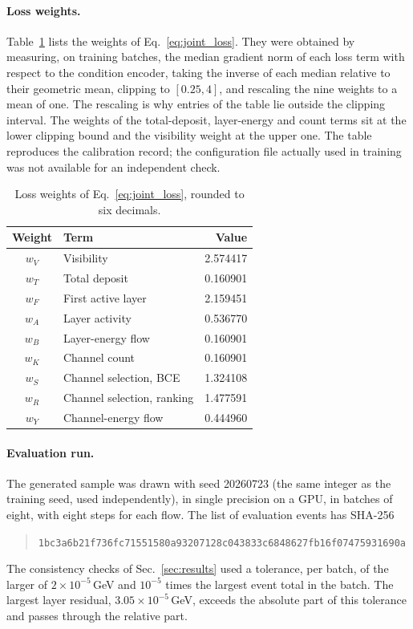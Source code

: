\documentclass[11pt]{article}
\begin{document}
\paragraph{Loss weights.} Table~\ref{tab:weights} lists the weights of Eq.~\eqref{eq:joint_loss}. They were obtained by measuring, on training batches, the median gradient norm of each loss term with respect to the condition encoder, taking the inverse of each median relative to their geometric mean, clipping to $[0.25,4]$, and rescaling the nine weights to a mean of one. The rescaling is why entries of the table lie outside the clipping interval. The weights of the total-deposit, layer-energy and count terms sit at the lower clipping bound and the visibility weight at the upper one. The table reproduces the calibration record; the configuration file actually used in training was not available for an independent check.

\begin{table}[H]
\centering
\caption{Loss weights of Eq.~\eqref{eq:joint_loss}, rounded to six decimals.}
\label{tab:weights}
\small
\begin{tabular}{@{}clr@{}}
\toprule
Weight & Term & Value \\
\midrule
$w_{V}$ & Visibility & 2.574417 \\
$w_{T}$ & Total deposit & 0.160901 \\
$w_{F}$ & First active layer & 2.159451 \\
$w_{A}$ & Layer activity & 0.536770 \\
$w_{B}$ & Layer-energy flow & 0.160901 \\
$w_{K}$ & Channel count & 0.160901 \\
$w_{S}$ & Channel selection, BCE & 1.324108 \\
$w_{R}$ & Channel selection, ranking & 1.477591 \\
$w_{Y}$ & Channel-energy flow & 0.444960 \\
\bottomrule
\end{tabular}
\end{table}

\paragraph{Evaluation run.} The generated sample was drawn with seed 20260723 (the same integer as the training seed, used independently), in single precision on a GPU, in batches of eight, with eight steps for each flow. The list of evaluation events has SHA-256
\begin{quote}\footnotesize\nolinkurl{1bc3a6b21f736fc71551580a93207128c043833c6848627fb16f07475931690a}\end{quote}
The consistency checks of Sec.~\ref{sec:results} used a tolerance, per batch, of the larger of $2\times10^{-5}$\,GeV and $10^{-5}$ times the largest event total in the batch. The largest layer residual, $3.05\times10^{-5}$\,GeV, exceeds the absolute part of this tolerance and passes through the relative part.
\end{document}
